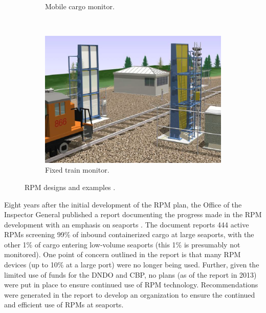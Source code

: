 \documentclass{report}
\begin{document}
\begin{figure}
\begin{subfigure}[b]{0.3\textwidth}
                \caption{Mobile cargo monitor.}
                \label{fig:mobile_cargo}
        \end{subfigure}
        ~ %
        \begin{subfigure}[b]{0.3\textwidth}
                \includegraphics[width=\textwidth,scale=1]{./figures/perm_train.png}
                \caption{Fixed train monitor.}
                \label{fig:perm_train}
        \end{subfigure}
        \caption{RPM designs and examples \cite{Simmons2005}.}\label{fig:RPM_designs}
\end{figure}
  




  

Eight years after the initial development of the RPM plan, the Office of the Inspector General published a report documenting the progress made in the RPM development with an emphasis on seaports \cite{DepartmentofHomelandSecurityDHS2013}. The document reports 444 active RPMs screening 99\% of inbound containerized cargo at large seaports, with the other 1\% of cargo entering low-volume seaports (this 1\% is presumably not monitored). 
One point of concern outlined in the report is that many RPM devices (up to 10\% at a large port) were no longer being used. Further, given the limited use of funds for the DNDO and CBP, no plans (as of the report in 2013) were put in place to ensure continued use of RPM technology. Recommendations were generated in the report to develop an organization to ensure the continued and efficient use of RPMs at seaports. 
\end{document}
